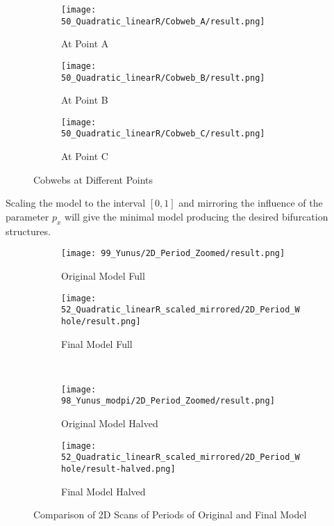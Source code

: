 \begin{figure}
    \centering
    \begin{subfigure}{0.3\textwidth}
        \centering
        \texttt{[image: 50\_Quadratic\_linearR/Cobweb\_A/result.png]}
        \caption{At Point A}
        \label{fig:quad.full.fit.lin.CobwebA}
    \end{subfigure}
    \begin{subfigure}{0.3\textwidth}
        \centering
        \texttt{[image: 50\_Quadratic\_linearR/Cobweb\_B/result.png]}
        \caption{At Point B}
        \label{fig:quad.full.fit.lin.CobwebB}
    \end{subfigure}
    \begin{subfigure}{0.3\textwidth}
        \centering
        \texttt{[image: 50\_Quadratic\_linearR/Cobweb\_C/result.png]}
        \caption{At Point C}
        \label{fig:quad.full.fit.lin.CobwebC}
    \end{subfigure}
    \caption{Cobwebs at Different Points}
    \label{fig:quad.full.fit.lin.Cobwebs}
\end{figure}

Scaling the model to the interval $[0, 1]$ and mirroring the influence of the parameter $p_x$ will give the minimal model producing the desired bifurcation structures.



\begin{figure}
    \centering
    \begin{subfigure}{0.4\textwidth}
        \centering
        \texttt{[image: 99\_Yunus/2D\_Period\_Zoomed/result.png]}
        \caption{Original Model Full}
        \label{fig:quad.final.comparison.og.full}
    \end{subfigure}
    \begin{subfigure}{0.4\textwidth}
        \centering
        \texttt{[image: 52\_Quadratic\_linearR\_scaled\_mirrored/2D\_Period\_Whole/result.png]}
        \caption{Final Model Full}
        \label{fig:quad.final.comparison.fin.full}
    \end{subfigure} \\
    \begin{subfigure}{0.4\textwidth}
        \centering
        \texttt{[image: 98\_Yunus\_modpi/2D\_Period\_Zoomed/result.png]}
        \caption{Original Model Halved}
        \label{fig:quad.final.comparison.og.halved}
    \end{subfigure}
    \begin{subfigure}{0.4\textwidth}
        \centering
        \texttt{[image: 52\_Quadratic\_linearR\_scaled\_mirrored/2D\_Period\_Whole/result-halved.png]}
        \caption{Final Model Halved}
        \label{fig:quad.final.comparison.fin.halved}
    \end{subfigure}
    \caption{Comparison of 2D Scans of Periods of Original and Final Model}
    \label{fig:quad.final.comparison}
\end{figure}
